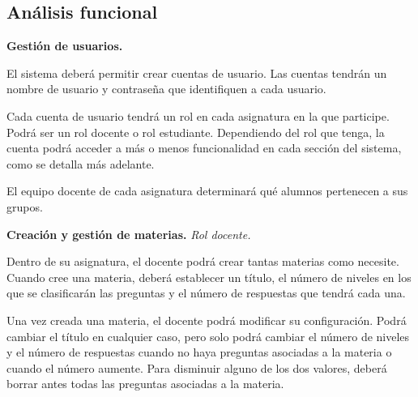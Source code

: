 \subsection{Análisis funcional}

\begin{rf0}

	\item \textbf{Gestión de usuarios.}
			\begin{rf0*}
				\item El sistema deberá permitir crear cuentas de usuario. Las cuentas tendrán un nombre de usuario y contraseña que identifiquen a cada usuario.
				\item Cada cuenta de usuario tendrá un rol en cada asignatura en la que participe. Podrá ser un rol docente o rol estudiante. Dependiendo del rol que tenga, la cuenta podrá acceder a más o menos funcionalidad en cada sección del sistema, como se detalla más adelante.
				\item El equipo docente de cada asignatura determinará qué alumnos pertenecen a sus grupos.
			\end{rf0*} 

	\item \textbf{Creación y gestión de materias.}  \textit{Rol docente.} 
			\begin{rf0*}
				\item Dentro de su asignatura, el docente podrá crear tantas materias como necesite. Cuando cree una materia, deberá establecer un título, el número de niveles en los que se clasificarán las preguntas y el número de respuestas que tendrá cada una.
				\item Una vez creada una materia, el docente podrá modificar su configuración. Podrá cambiar el título en cualquier caso, pero solo podrá cambiar el número de niveles y el número de respuestas cuando no haya preguntas asociadas a la materia o cuando el número aumente. Para disminuir alguno de los dos valores, deberá borrar antes todas las preguntas asociadas a la materia.
			\end{rf0*}


\end{rf0}
